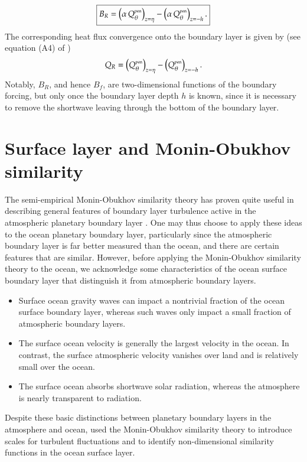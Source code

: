 \begin{equation}
\boxed{
 B_{R} = \left( \alpha \, Q_{\theta}^{\mbox{\tiny pen}} \right)_{z=\eta}
          -\left( \alpha \, Q_{\theta}^{\mbox{\tiny pen}} \right)_{z=-h}.
}
\label{eq:penetrative-buoyancy-kpp}
\end{equation}
The corresponding heat flux convergence onto the boundary layer is
given by (see equation (A4) of \cite{LargeKPP})
\begin{equation}
 Q_{R} = \left(Q_{\theta}^{\mbox{\tiny pen}} \right)_{z=\eta}
          -\left(Q_{\theta}^{\mbox{\tiny pen}} \right)_{z=-h}.
\label{eq:penetrative-heating-kpp}
\end{equation}
Notably, $B_{R}$, and hence $B_{f}$, are two-dimensional functions of
the boundary forcing, but only once the boundary layer depth $h$ is
known, since it is necessary to remove the shortwave leaving through
the bottom of the boundary layer.


\section{Surface layer and Monin-Obukhov similarity}
\label{section:m-o-similarity}

The semi-empirical Monin-Obukhov similarity theory has proven quite
useful in describing general features of boundary layer turbulence
active in the atmospheric planetary boundary layer \citep[see, e.g.,
Section 3.3 of][]{KanthaClaysonII}. One may thus choose to apply these
ideas to the ocean planetary boundary layer, particularly since the
atmospheric boundary layer is far better measured than the ocean, and
there are certain features that are similar. However, before applying
the Monin-Obukhov similarity theory to the ocean, we acknowledge some
characteristics of the ocean surface boundary layer that distinguish
it from atmospheric boundary layers.

\begin{itemize}

\item Surface ocean gravity waves can impact a nontrivial fraction of
  the ocean surface boundary layer, whereas such waves only impact a
  small fraction of atmospheric boundary layers.

\item The surface ocean velocity is generally the largest velocity in
  the ocean. In contrast, the surface atmospheric velocity vanishes
  over land and is relatively small over the ocean.

\item The surface ocean absorbs shortwave solar radiation, whereas the
  atmosphere is nearly transparent to radiation.

\end{itemize}
Despite these basic distinctions between planetary boundary layers in
the atmosphere and ocean, \cite{LargeKPP} used the Monin-Obukhov
similarity theory to introduce scales for turbulent fluctuations and
to identify non-dimensional similarity functions in the ocean surface
layer.


